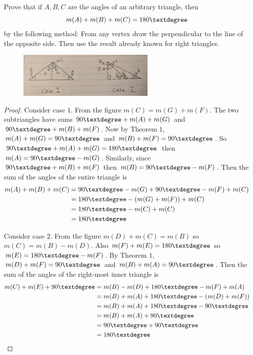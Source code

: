 \begin{tcolorbox}[title=Problem 10, breakable]
    Prove that if $A, B, C$ are the angles of an arbitrary triangle, then
    \[m(A) + m(B) + m(C) = 180\textdegree\]
    by the following method: From any vertex draw the perpendicular to 
    the line of the opposite side. Then use the result already known for 
    right triangles.
\end{tcolorbox}

\begin{figure}[h]
    \centering
    \includegraphics[width=0.6\textwidth]{images/5_4.jpg}
\end{figure}

\begin{proof}
    Consider case $1$. From the figure $m(C) = m(G) + m(F)$.
    The two subtriangles have sums $90\textdegree + m(A) + m(G)$
        and $90\textdegree + m(B) + m(F)$.
    Now by Theorem $1$, $m(A) + m(G) = 90\textdegree$
        and $m(B) + m(F) = 90\textdegree$.
    So $90\textdegree + m(A) + m(G) = 180\textdegree$ then $m(A) = 90\textdegree - m(G)$.
    Similarly, since $90\textdegree + m(B) + m(F)$ then $m(B) = 90\textdegree - m(F)$.
    Then the sum of the angles of the entire 
        triangle is 
    \begin{align*}
        m(A) + m(B) + m(C) 
        &= 90\textdegree - m(G) + 90\textdegree - m(F) + m(C) \\
        &= 180\textdegree -(m(G) + m(F)) + m(C) \\
        &= 180\textdegree - m(C) + m(C) \\
        &= 180\textdegree
    \end{align*}

    Consider case $2$. From the figure $m(D) + m(C) = m(B)$ so $m(C) = m(B) - m(D)$.
    Also $m(F) + m(E) = 180\textdegree$ so $m(E) = 180\textdegree - m(F)$.
    By Theorem $1$, $m(D) + m(F) = 90\textdegree$ and $m(B) + m(A) = 90\textdegree$.
    Then the sum of the angles of the right-most inner triangle is
    \begin{align*}
        m(C) + m(E) + 90\textdegree
        &= m(B) - m(D) + 180\textdegree - m(F) + m(A) \\
        &= m(B) + m(A) + 180\textdegree - (m(D) + m(F)) \\
        &= m(B) + m(A) + 180\textdegree - 90\textdegree \\
        &= m(B) + m(A) + 90\textdegree \\
        &= 90\textdegree + 90\textdegree \\
        &= 180\textdegree
    \end{align*}
\end{proof}

